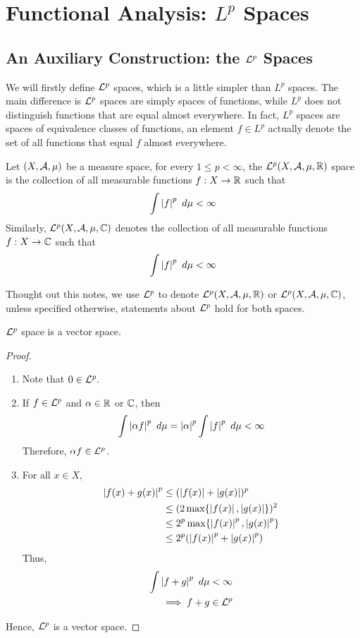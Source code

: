 \documentclass[11pt]{article}
\begin{document}
	\newpage
	\section{Functional Analysis: $L^p$ Spaces}
	\subsection{An Auxiliary Construction: the $\mathcal{{L}}^p$ Spaces}
	We will firstly define $\mathcal{{L}}^p$ spaces, which is a little simpler than $L^p$ spaces. The main difference is $\mathcal{{L}}^p$ spaces are simply spaces of functions, while $L^p$ does not distinguish functions that are equal almost everywhere. In fact, $L^p$ spaces are spaces of equivalence classes of functions, an element $f \in L^p$ actually denote the set of all functions that equal $f$ almost everywhere.
	\begin{definition}
		Let $(X, \mathcal{{A}}, \mu)$ be a measure space, for every $1 \leq p < \infty$, the $\mathcal{{L}}^p(X, \mathcal{{A}}, \mu, \mathbb{R})$ space is the collection of all measurable functions $f: X \to \mathbb{R}$ such that
		\begin{align}
			\int \left \vert {f} \right \vert^p\ d\mu < \infty
		\end{align}
		Similarly, $\mathcal{{L}}^p(X, \mathcal{{A}}, \mu, \mathbb{C})$ denotes the collection of all measurable functions $f: X \to \mathbb{C}$ such that
		\begin{align}
			\int \left \vert {f} \right \vert^p\ d\mu < \infty
		\end{align}
	\end{definition}
	Thought out this notes, we use $\mathcal{{L}}^p$ to denote $\mathcal{{L}}^p(X, \mathcal{{A}}, \mu, \mathbb{R})$ or $\mathcal{{L}}^p(X, \mathcal{{A}}, \mu, \mathbb{C})$, unless specified otherwise, statements about $\mathcal{{L}}^p$ hold for both spaces.
	\begin{proposition}
		$\mathcal{{L}}^p$ space is a vector space.
		\begin{proof} \quad
		\begin{enumerate}
		\item Note that $0 \in \mathcal{{L}}^p$.
		\item If $f \in \mathcal{{L}}^p$ and $\alpha \in \mathbb{R}$ or $\mathbb{C}$, then
		\begin{align}
			\int \abs{\alpha f}^p\ d\mu = \abs{\alpha}^p \int \abs{f}^p\ d\mu < \infty
		\end{align}
		Therefore, $\alpha f \in \mathcal{{L}}^p$.
		\item For all $x \in X$,
		\begin{align}
			\left \vert {f(x) + g(x)} \right \vert^p &\leq (\left \vert {f(x)} \right \vert + \left \vert {g(x)} \right \vert)^p \\
			&\leq (2 \max\{\left \vert {f(x)} \right \vert, \left \vert {g(x)} \right \vert\})^2 \\
			&\leq 2^p \max\{\left \vert {f(x)} \right \vert^p, \left \vert {g(x)} \right \vert^p\} \\
			&\leq 2^p (\left \vert {f(x)} \right \vert^p + \left \vert {g(x)} \right \vert^p)
		\end{align}
		Thus,
		\begin{align}
		\int \left \vert {f+g} \right \vert^p\ d\mu &< \infty \\
			\implies f + g &\in \mathcal{{L}}^p
		\end{align}
		\end{enumerate}
		Hence, $\mathcal{{L}}^p$ is a vector space.
		\end{proof}
	\end{proposition}
	
\end{document}
